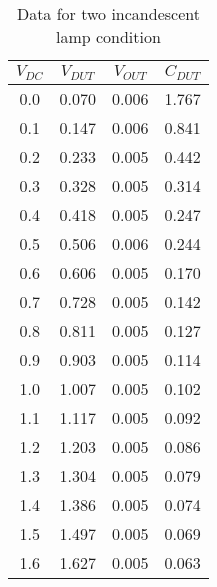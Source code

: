 \begin{table}[H]
    \centering
    \begin{tabular}{|c|c|c|c|}
        \hline
        $V_{DC}$ & $V_{DUT}$ & $V_{OUT}$ & $C_{DUT}$   \\ \hline
        0.0      & 0.070     & 0.006     & 1.767 \\
        0.1      & 0.147     & 0.006     & 0.841 \\
        0.2      & 0.233     & 0.005     & 0.442 \\
        0.3      & 0.328     & 0.005     & 0.314 \\
        0.4      & 0.418     & 0.005     & 0.247 \\
        0.5      & 0.506     & 0.006     & 0.244 \\
        0.6      & 0.606     & 0.005     & 0.170 \\
        0.7      & 0.728     & 0.005     & 0.142 \\
        0.8      & 0.811     & 0.005     & 0.127 \\
        0.9      & 0.903     & 0.005     & 0.114 \\
        1.0      & 1.007     & 0.005     & 0.102 \\
        1.1      & 1.117     & 0.005     & 0.092 \\
        1.2      & 1.203     & 0.005     & 0.086 \\
        1.3      & 1.304     & 0.005     & 0.079 \\
        1.4      & 1.386     & 0.005     & 0.074 \\
        1.5      & 1.497     & 0.005     & 0.069 \\
        1.6      & 1.627     & 0.005     & 0.063 \\ \hline
    \end{tabular}
    \caption{Data for two incandescent lamp condition}
    \label{tab:3}
\end{table}